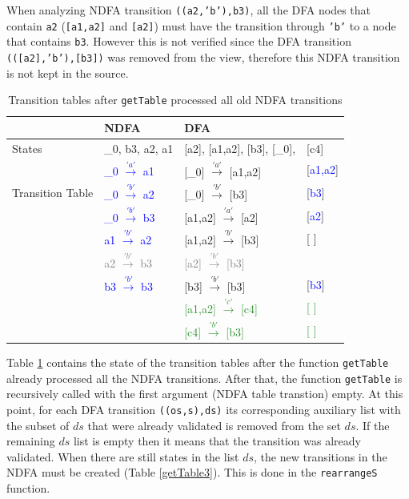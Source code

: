 When analyzing NDFA transition \texttt{((a2,'b'),b3)}, all the DFA nodes that contain \texttt{a2} (\texttt{[a1,a2]} and \texttt{[a2]}) must have the transition through \texttt{'b'} to a node that contains \texttt{b3}. However this is not verified since the DFA transition \texttt{(([a2],'b'),[b3])} was removed from the view, therefore this NDFA transition is not kept in the source.


\begin{table}[H]
  \begin{center}
    \begin{tabular}{ | p{3cm} |p{4cm}||p{3cm} p{1cm} |  }
    \hline
         & NDFA & DFA & \\ [1ex]
        \hline
        States & \_0, b3, a2, a1 & [a2], [a1,a2], [b3], [\_0], & [c4]\\ [0.7ex]
        \hline
        \multirow{3}{5em}{Transition Table} & \textcolor{blue}{\_0 $\xrightarrow{'a'}$ a1} & [\_0] $\xrightarrow{'a'}$ [a1,a2] & [\textcolor{blue}{a1,a2}]\\
        & \textcolor{blue}{\_0 $\xrightarrow{'b'}$ a2} & [\_0]   $\xrightarrow{'b'}$ [b3] & [\textcolor{blue}{b3}]\\
        & \textcolor{blue}{\_0 $\xrightarrow{'b'}$ b3} & [a1,a2]  $\xrightarrow{'a'}$ [a2] & [\textcolor{blue}{a2}]\\
        & \textcolor{blue}{a1  $\xrightarrow{'b'}$ a2} & [a1,a2]  $\xrightarrow{'b'}$ [b3] & [ ]\\
        & \textcolor{gray}{a2  $\xrightarrow{'b'}$ b3} & \textcolor{gray}{[a2]     $\xrightarrow{'b'}$ [b3]} &  \\
        & \textcolor{blue}{b3  $\xrightarrow{'b'}$ b3} & [b3]     $\xrightarrow{'b'}$ [b3] & [\textcolor{blue}{b3}]\\
        &  & \textcolor{ForestGreen}{[a1,a2]  $\xrightarrow{'c'}$ [c4]} & \textcolor{ForestGreen}{[ ]}\\
        &  & \textcolor{ForestGreen}{[c4]  $\xrightarrow{'b'}$ [b3]} & \textcolor{ForestGreen}{[ ]}\\
        \hline
        \end{tabular}
  \end{center}
  \caption{Transition tables after \texttt{getTable} processed all old NDFA transitions}
  \label{getTable2}
\end{table}

Table \ref{getTable2} contains the state of the transition tables after the function \texttt{getTable} already processed all the NDFA transitions. After that, the function \texttt{getTable} is recursively called with the first argument (NDFA table transtion) empty. At this point, for each DFA transition \texttt{((os,s),ds)} its corresponding auxiliary list with the subset of $ds$ that were already validated is removed from the set $ds$. If the remaining $ds$ list is empty then it means that the transition was already validated. When there are still states in the list $ds$, the new transitions in the NDFA must be created (Table \ref{getTable3}). This is done in the \texttt{rearrangeS} function. 

